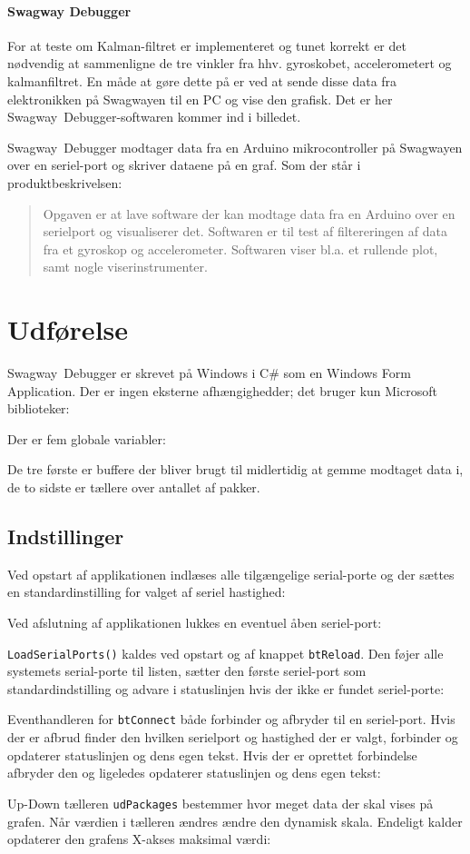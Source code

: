 \documentclass[a4paper,oneside,article,danish,table]{memoir}
\newcommand{\form}[2]{}
\begin{document}
\subsubsection{Swagway Debugger}
For at teste om Kalman-filtret er implementeret og tunet korrekt er det nødvendig at sammenligne de tre vinkler fra hhv. gyroskobet, accelerometert og kalmanfiltret. En måde at gøre dette på er ved at sende disse data fra elektronikken på Swagwayen til en PC og vise den grafisk. Det er her Swagway~Debugger-softwaren kommer ind i billedet.

Swagway~Debugger modtager data fra en Arduino mikrocontroller på Swagwayen over en seriel-port og skriver dataene på en graf. Som der står i produktbeskrivelsen:
\begin{quotation}
  Opgaven er at lave software der kan modtage data fra en Arduino over en serielport og visualiserer det. Softwaren er til test af filtereringen af data fra et gyroskop og accelerometer. Softwaren viser bl.a. et rullende plot, samt nogle viserinstrumenter.
\end{quotation}

\chapter{Udførelse}
Swagway~Debugger er skrevet på Windows i C\# som en Windows Form Application. Der er ingen eksterne afhængighedder; det bruger kun Microsoft biblioteker: 
\form{9}{12}
Der er fem globale variabler:
\form{18}{23}
De tre første er buffere der bliver brugt til midlertidig at gemme modtaget data i, de to sidste er tællere over antallet af pakker.

\section{Indstillinger}
Ved opstart af applikationen indlæses alle tilgængelige serial-porte og der sættes en standardinstilling for valget af seriel hastighed:
\form{34}{39}
Ved afslutning af applikationen lukkes en eventuel åben seriel-port:
\form{41}{48}

\texttt{LoadSerialPorts()} kaldes ved opstart og af knappet \texttt{btReload}. Den føjer alle systemets serial-porte til listen, sætter den første seriel-port som standardindstilling og advare i statuslinjen hvis der ikke er fundet seriel-porte:
\form{50}{68}

Eventhandleren for \texttt{btConnect} både forbinder og afbryder til en seriel-port. Hvis der er afbrud finder den hvilken serielport og hastighed der er valgt, forbinder og opdaterer statuslinjen og dens egen tekst. Hvis der er oprettet forbindelse afbryder den og ligeledes opdaterer statuslinjen og dens egen tekst:
\form{76}{104}
Up-Down tælleren%
\texttt{udPackages} bestemmer hvor meget data der skal vises på grafen. Når værdien i tælleren ændres ændre den dynamisk skala. Endeligt kalder opdaterer den grafens X-akses maksimal værdi:
\form{106}{125}
\end{document}
